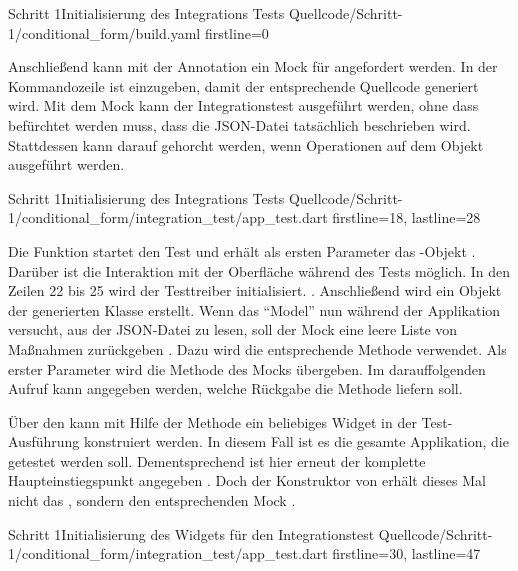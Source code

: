 \begin{alexyamllisting}{Schritt 1}{Initialisierung des Integrations Tests}
  {Quellcode/Schritt-1/conditional_form/build.yaml}
  {firstline=0}
  \label{lst:Schritt1IntegrationsTestInitialisierung}
\end{alexyamllisting}

Anschließend kann mit der Annotation   ein Mock für  angefordert werden.
In der Kommandozeile ist  einzugeben, damit der entsprechende Quellcode generiert wird.
Mit dem Mock kann der Integrationstest ausgeführt werden, ohne dass befürchtet werden muss, dass die JSON-Datei tatsächlich beschrieben wird.
Stattdessen kann darauf gehorcht werden, wenn Operationen auf dem Objekt ausgeführt werden. 

\begin{alexlisting}{Schritt 1}{Initialisierung des Integrations Tests}
  {Quellcode/Schritt-1/conditional_form/integration_test/app_test.dart}
  {firstline=18, lastline=28}
  \label{lst:Schritt1IntegrationsTestInitialisierung}
\end{alexlisting}

Die Funktion  startet den Test und erhält als ersten Parameter das -Objekt .
Darüber ist die Interaktion mit der Oberfläche während des Tests möglich.
In den Zeilen 22 bis 25 wird der Testtreiber initialisiert. . Anschließend wird ein Objekt der generierten Klasse  erstellt. Wenn das \enquote{Model} nun während der Applikation versucht, aus der JSON-Datei zu lesen, soll der Mock eine leere Liste von Maßnahmen zurückgeben . Dazu wird die entsprechende Methode  verwendet. Als erster Parameter wird die Methode  des Mocks übergeben. Im darauffolgenden Aufruf  kann angegeben werden, welche Rückgabe die Methode liefern soll.

Über den  kann mit Hilfe der Methode  ein beliebiges Widget in der Test-Ausführung konstruiert werden.
In diesem Fall ist es die gesamte Applikation, die getestet werden soll.
Dementsprechend ist  hier erneut der komplette Haupteinstiegspunkt angegeben \Lst{\ref{lst:Schritt1IntegrationsTestWidgetInitialisierung}}.
Doch der Konstruktor von  erhält dieses Mal nicht das , sondern den entsprechenden Mock . 

\begin{alexlisting}{Schritt 1}{Initialisierung des Widgets für den Integrationstest}
  {Quellcode/Schritt-1/conditional_form/integration_test/app_test.dart}
  {firstline=30, lastline=47}
  \label{lst:Schritt1IntegrationsTestWidgetInitialisierung}
\end{alexlisting}



